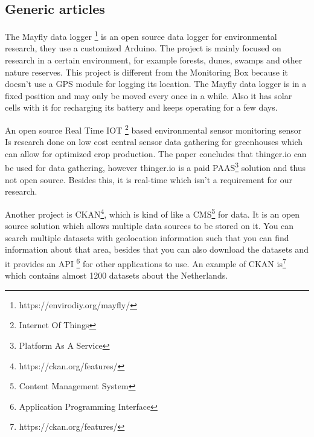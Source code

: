 \documentclass[conference]{IEEEtran}
\begin{document}
\subsection{Generic articles}
The Mayfly data logger \footnote{ https://envirodiy.org/mayfly/} is an open source data logger for environmental research, they use a customized Arduino. The project is mainly focused on research in a certain environment, for example forests, dunes, swamps and other nature reserves. This project is different from the Monitoring Box because it doesn't use a GPS module for logging its location. The Mayfly data logger is in a fixed position and may only be moved every once in a while. Also it has solar cells with it for recharging its battery and keeps operating for a few days. 
\par
An open source Real Time IOT \footnote{ Internet Of Things} based environmental sensor monitoring sensor \cite{ICRISET2017:An_open_source_Real} Is research done on low cost central sensor data gathering for greenhouses which can allow for optimized crop production. The paper concludes that thinger.io can be used for data gathering, however thinger.io is a paid PAAS\footnote{ Platform As A Service} solution and thus not open source. Besides this, it is real-time which isn't a requirement for our research.
\par
Another project is CKAN\footnote{ https://ckan.org/features/}, which is kind of like a CMS\footnote{ Content Management System} for data. It is an open source solution which allows multiple data sources to be stored on it. You can search multiple datasets with geolocation information such that you can find information about that area, besides that you can also download the datasets and it provides an API \footnote{ Application Programming Interface} for other applications to use. An example of CKAN is\footnote{ https://ckan.org/features/}  which contains almost 1200 datasets about the Netherlands.
\end{document}
